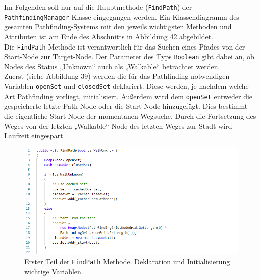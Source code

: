 \documentclass[a4paper,12pt]{article}
\newcommand{\code}{\texttt}
\begin{document}
Im Folgenden soll nur auf die Hauptmethode (\code{FindPath}) der \code{PathfindingManager} Klasse eingegangen werden. Ein Klassendiagramm des gesamten Pathfinding-Systems mit den jeweils wichtigsten Methoden und Attributen ist am Ende des Abschnitts in Abbildung 42 abgebildet.
\\[0.4cm]
Die \code{FindPath} Methode ist verantwortlich für das Suchen eines Pfades von der Start-Node zur Target-Node. Der Parameter des Typs \code{Boolean} gibt dabei an, ob Nodes des Status „Unknown“ auch als „Walkable“ betrachtet werden.
\\[0.4cm]
Zuerst (siehe Abbildung 39) werden die für das Pathfinding notwendigen Variablen \code{openSet} und \code{closedSet} deklariert. Diese werden, je nachdem welche Art Pathfinding vorliegt, initialisiert. Außerdem wird dem \code{openSet} entweder die gespeicherte letzte Path-Node oder die Start-Node hinzugefügt. Dies bestimmt die eigentliche Start-Node der momentanen Wegsuche. Durch die Fortsetzung des Weges von der letzten „Walkable“-Node des letzten Weges zur Stadt wird Laufzeit eingespart.
\begin{figure}[H]
    \centering
    \includegraphics[width=1\linewidth]{Bilder/Aufgabe3/Teilaufgabe_C/Pathfinding_01.png}
    \caption{Erster Teil der \code{FindPath} Methode. Deklaration und Initialisierung wichtige Variablen.}
\end{figure}
\end{document}
